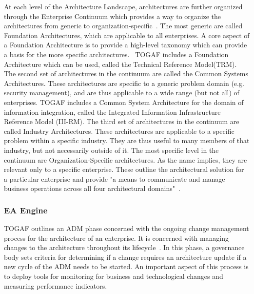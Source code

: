 At each level of the Architecture Landscape, architectures are further organized through the Enterprise Continuum which provides a way to organize the architectures from generic to organization-specific~\cite{togaf9.1}. The most generic are called Foundation Architectures, which are applicable to all enterprises. A core aspect of a Foundation Architecture is to provide a high-level taxonomy which can provide a basis for the more specific architectures.~\cite{togaf9.1} TOGAF includes a Foundation Architecture which can be used, called the Technical Reference Model(TRM). The second set of architectures in the continuum are called the Common Systems Architectures. These architectures are specific to a generic problem domain (e.g. security management), and are thus applicable to a wide range (but not all) of enterprises. TOGAF includes a Common System Architecture for the domain of information integration, called the Integrated Information Infrastructure Reference Model (III-RM). The third set of architectures in the continuum are called Industry Architectures. These architectures are applicable to a specific problem within a specific industry. They are thus useful to many members of that industry, but not necessarily outside of it. The most specific level in the continuum are Organization-Specific  architectures. As the name implies, they are relevant only to a specific enterprise. These outline the architectural solution for a particular enterprise and provide "a means to communicate and manage business operations across all four architectural domains"~\cite{togaf9.1}.





\subsubsection{EA Engine}

TOGAF outlines an ADM phase concerned with the ongoing change management process for the architecture of an enterprise.  It is concerned with managing changes to the architecture throughout its lifecycle~\cite{togaf9.1}. In this phase, a governance body sets criteria for determining if a change requires an architecture update if a new cycle of the ADM needs to be started. An important aspect of this process is to deploy tools for monitoring for business and technological changes and measuring performance indicators. 

